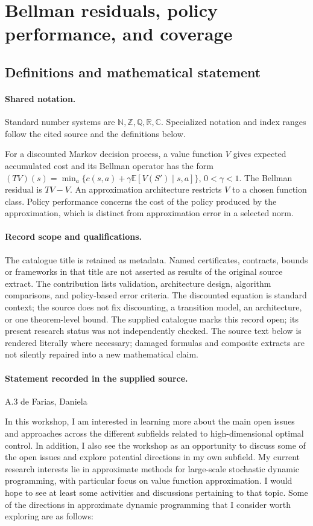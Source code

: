\documentclass[11pt]{article}
\begin{document}
\section{Bellman residuals, policy performance, and coverage}\label{statement}

\subsection{Definitions and mathematical statement}

\paragraph{Shared notation.}Standard number systems are $\mathbb N,\mathbb Z,\mathbb Q,\mathbb R,\mathbb C$. Specialized notation and index ranges follow the cited source and the definitions below.


For a discounted Markov decision process, a value function $V$ gives expected accumulated cost and its Bellman operator has the form $(TV)(s)=\min_a\{c(s,a)+\gamma\mathbb E[V(S')\mid s,a]\}$, $0<\gamma<1$. The Bellman residual is $TV-V$. An approximation architecture restricts $V$ to a chosen function class. Policy performance concerns the cost of the policy produced by the approximation, which is distinct from approximation error in a selected norm.
\paragraph{Record scope and qualifications.}
The catalogue title is retained as metadata. Named certificates, contracts, bounds or frameworks in that title are not asserted as results of the original source extract.
The contribution lists validation, architecture design, algorithm comparisons, and policy-based error criteria. The discounted equation is standard context; the source does not fix discounting, a transition model, an architecture, or one theorem-level bound. The supplied catalogue marks this record open; its present research status was not independently checked.
The source text below is rendered literally where necessary; damaged formulas and composite extracts are not silently repaired into a new mathematical claim.
\paragraph{Statement recorded in the supplied source.}
A.3 de Farias, Daniela

In this workshop, I am interested in learning more about the main open issues and approaches across the different subfields related to high-dimensional optimal control. In addition, I also see the workshop as an opportunity to discuss some of the open issues and explore potential directions in my own subfield. My current research interests lie in approximate methods for large-scale stochastic dynamic programming, with particular focus on value function approximation. I would hope to see at least some activities and discussions pertaining to that topic. Some of the directions in approximate dynamic programming that I consider worth exploring are as follows:
\end{document}
